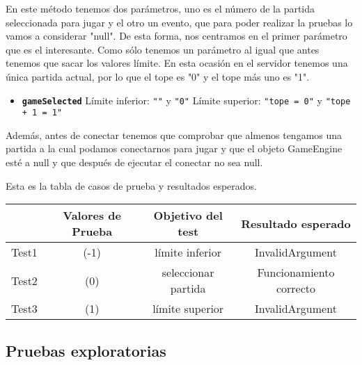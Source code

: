 En este método tenemos dos parámetros, uno es el número de la partida seleccionada para jugar y el otro un evento, que para poder realizar la pruebas lo vamos a considerar "null". De esta forma, nos centramos en el primer parámetro que es el interesante. Como sólo tenemos un parámetro al igual que antes tenemos que sacar los valores límite. En esta ocasión en el servidor tenemos una única partida actual, por lo que el tope es "0" y el tope más uno es "1".

\begin{itemize}
\item \textbf{\texttt{gameSelected}}
\subitem Límite inferior: \texttt{""} y \texttt{"0"}
\subitem Límite superior: \texttt{"tope = 0"} y \texttt{"tope + 1 = 1"}
\end{itemize}

Además, antes de conectar tenemos que comprobar que almenos tengamos una partida a la cual podamos conectarnos para jugar y que el objeto GameEngine esté a null y que después de ejecutar el conectar no sea null.

Esta es la tabla de casos de prueba y resultados esperados.

{\footnotesize
\begin{longtable}[c]{lccc}
 & \textbf{Valores de Prueba} & \textbf{Objetivo del test} & \textbf{Resultado esperado} \\
\hline \hline
\endhead

Test1 & (-1) & límite inferior & InvalidArgument\\
Test2 & (0) & seleccionar partida & Funcionamiento correcto\\
Test3 & (1) & límite superior & InvalidArgument\\

\hline
\end{longtable}
}


\subsection{Pruebas exploratorias}

